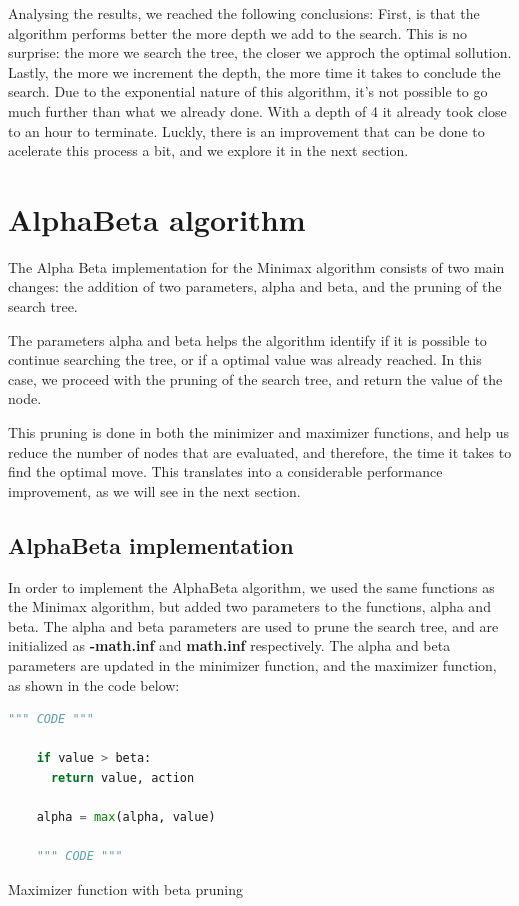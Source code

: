 \documentclass{article}
\begin{document}
Analysing the results, we reached the following conclusions: First, is that the algorithm performs better the more depth we add to the search. This is no surprise: the more we search the tree, the closer we approch the optimal sollution.
Lastly, the more we increment the depth, the more time it takes to conclude the search. Due to the exponential nature of this algorithm, it's not possible to go much further than what we already done. With a depth of 4 it already took close to an hour to terminate. Luckly, there is an improvement that can be done to acelerate this process a bit, and we explore it in the next section.

\pagebreak
\section{AlphaBeta algorithm}

The Alpha Beta implementation for the Minimax algorithm consists of two main changes: the addition of two parameters, alpha and beta, and the pruning of the search tree.

The parameters alpha and beta helps the algorithm identify if it is possible to continue searching the tree, or if a optimal value was already reached. In this case, we proceed with the pruning of the search tree, and return the value of the node.

This pruning is done in both the minimizer and maximizer functions, and help us reduce the number of nodes that are evaluated, and therefore, the time it takes to find the optimal move. This translates into a considerable performance improvement, as we will see in the next section.

\subsection{AlphaBeta implementation}

In order to implement the AlphaBeta algorithm, we used the same functions as the Minimax algorithm, but added two parameters to the functions, alpha and beta. The alpha and beta parameters are used to prune the search tree, and are initialized as \textbf{-math.inf} and \textbf{math.inf} respectively. The alpha and beta parameters are updated in the minimizer function, and the maximizer function, as shown in the code below:

\begin{table}[!ht]
  \begin{lstlisting}[language=python, frame=tlbr, framesep=6pt, backgroundcolor=\color{light-gray}]
    """ CODE """

    if value > beta:
      return value, action

    alpha = max(alpha, value)

    """ CODE """
  \end{lstlisting}
  \caption{Maximizer function with beta pruning}
\end{table}
\end{document}
